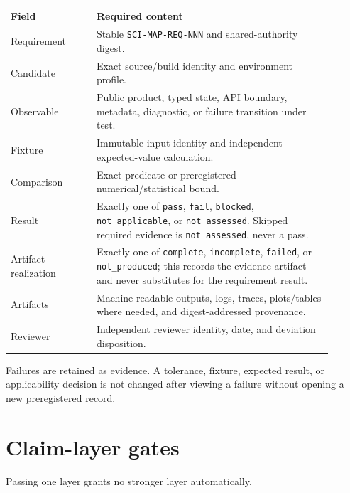 \documentclass[10pt]{article}
\begin{document}
\begin{longtable}{L{0.24\linewidth}L{0.66\linewidth}}
\toprule
Field & Required content\\
\midrule
Requirement & Stable \texttt{SCI-MAP-REQ-NNN} and shared-authority digest.\\
Candidate & Exact source/build identity and environment profile.\\
Observable & Public product, typed state, API boundary, metadata, diagnostic,
or failure transition under test.\\
Fixture & Immutable input identity and independent expected-value calculation.\\
Comparison & Exact predicate or preregistered numerical/statistical bound.\\
Result & Exactly one of \texttt{pass}, \texttt{fail}, \texttt{blocked},
\texttt{not\_applicable}, or \texttt{not\_assessed}. Skipped required evidence
is \texttt{not\_assessed}, never a pass.\\
Artifact realization & Exactly one of \texttt{complete},
\texttt{incomplete}, \texttt{failed}, or \texttt{not\_produced}; this records
the evidence artifact and never substitutes for the requirement result.\\
Artifacts & Machine-readable outputs, logs, traces, plots/tables where needed,
and digest-addressed provenance.\\
Reviewer & Independent reviewer identity, date, and deviation disposition.\\
\bottomrule
\end{longtable}

\SCIMapRequirementResultDefinition

Failures are retained as evidence. A tolerance, fixture, expected result, or
applicability decision is not changed after viewing a failure without opening
a new preregistered record.

\clearpage
\section{Claim-layer gates}

Passing one layer grants no stronger layer automatically.
\end{document}
